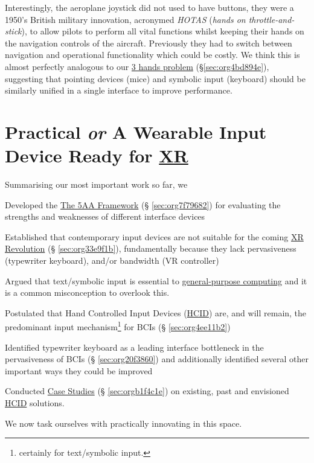 \documentclass[logo,bsc,singlespacing,parskip]{infthesis}
\begin{document}
Interestingly, the aeroplane joystick did not used to have buttons, they were a 1950's British military innovation, acronymed \emph{HOTAS} (\emph{hands on throttle-and-stick}), to allow pilots to perform all vital functions whilst keeping their hands on the navigation controls of the aircraft.
Previously they had to switch between navigation and operational functionality which could be costly.
We think this is almost perfectly analogous to our \hyperref[sec:org4bd894e]{3 hands problem} (\S \ref{sec:org4bd894e}), suggesting that pointing devices (mice) and symbolic input (keyboard) should be similarly unified in a single interface to improve performance.

\part{Practical \emph{or} A Wearable Input Device Ready for \hyperref[org39cbd51]{XR}}
\label{sec:org5f92648}
Summarising our most important work so far, we
\begin{enumerate*}[label={\arabic*)}, itemjoin={, \,}, itemjoin*={, and \,}]
\item Developed the \hyperref[sec:org7f79682]{The 5AA Framework} (§ \ref{sec:org7f79682}) for evaluating the strengths and weaknesses of different interface devices
\item Established that contemporary input devices are not suitable for the coming \hyperref[sec:org33e9f1b]{XR Revolution} (§ \ref{sec:org33e9f1b}), fundamentally because they lack pervasiveness (typewriter keyboard), and/or bandwidth (VR controller)
\item Argued that text/symbolic input is essential to \hyperref[orgbaec896]{general-purpose computing} and it is a common misconception to overlook this.
\item Postulated that Hand Controlled Input Devices (\hyperref[org0c83164]{HCID}) are, and will remain, the predominant input mechanism\footnote{certainly for text/symbolic input.} for BCIs (§ \ref{sec:org4ee11b2})
\item Identified typewriter keyboard as a leading interface bottleneck in the pervasiveness of BCIs (§ \ref{sec:org20f3860}) and additionally identified several other important ways they could be improved
\item Conducted \hyperref[sec:orgb1f4c1e]{Case Studies} (§ \ref{sec:orgb1f4c1e}) on existing, past and envisioned \hyperref[org0c83164]{HCID} solutions.
\end{enumerate*}
We now task ourselves with practically innovating in this space. \medskip
\end{document}
